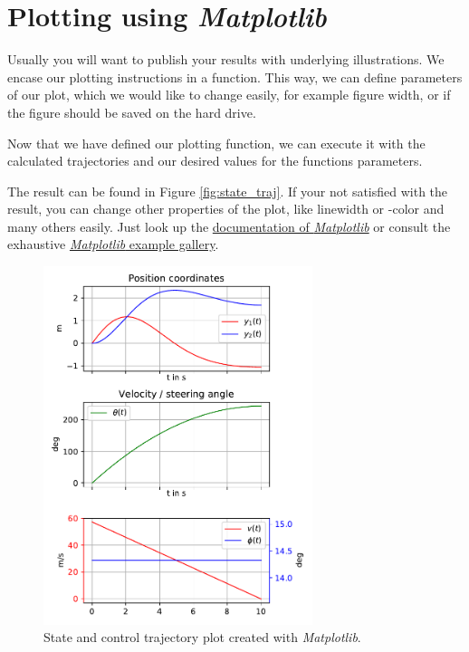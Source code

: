 \documentclass[a4paper,11pt,headings=standardclasses,parskip=half]{scrartcl}
\newcommand{\listcode}[3]{}
\newcommand{\listcodeplot}[2]{\listcode{#1}{#2}{../sim/01_car_example_plotting.py}}
\newcommand{\mpl}{\emph{Matplotlib}\xspace}
\begin{document}
\section{Plotting using \mpl} \label{sec:plot}
Usually you will want to publish your results with underlying illustrations. We encase our plotting instructions in a function. This way, we can define parameters of our plot, which we would like to change easily, for example figure width, or if the figure should be saved on the hard drive.
\listcodeplot{63}{132}
Now that we have defined our plotting function, we  can execute it with the calculated trajectories and our desired values for the functions parameters.
\listcodeplot{145}{148}
The result can be found in Figure \ref{fig:state_traj}. If your not satisfied with the result, you can change other properties of the plot, like linewidth or -color and many others easily. Just look up the \href{https://matplotlib.org/api/pyplot_summary.html}{documentation of \mpl} or consult the exhaustive \href{https://matplotlib.org/gallery/index.html}{\mpl example gallery}.
\begin{figure}[h]
\label{fig:state_traj}
   \centering      
   \includegraphics[width=0.7\textwidth]{img/state_trajectory.pdf}      
 \caption{State and control trajectory plot created with \mpl.}
 \label{fig:Test}
\end{figure} 


\FloatBarrier
\end{document}
